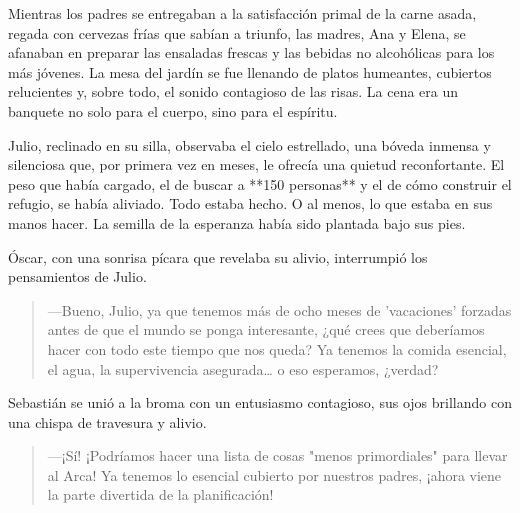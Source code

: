 \documentclass[a4paper,12pt]{book}
\begin{document}
Mientras los padres se entregaban a la satisfacción primal de la carne asada, regada con cervezas frías que sabían a triunfo, las madres, Ana y Elena, se afanaban en preparar las ensaladas frescas y las bebidas no alcohólicas para los más jóvenes. La mesa del jardín se fue llenando de platos humeantes, cubiertos relucientes y, sobre todo, el sonido contagioso de las risas. La cena era un banquete no solo para el cuerpo, sino para el espíritu.

Julio, reclinado en su silla, observaba el cielo estrellado, una bóveda inmensa y silenciosa que, por primera vez en meses, le ofrecía una quietud reconfortante. El peso que había cargado, el de buscar a **150 personas** y el de cómo construir el refugio, se había aliviado. Todo estaba hecho. O al menos, lo que estaba en sus manos hacer. La semilla de la esperanza había sido plantada bajo sus pies.

Óscar, con una sonrisa pícara que revelaba su alivio, interrumpió los pensamientos de Julio.
\begin{quote}
    —Bueno, Julio, ya que tenemos más de ocho meses de 'vacaciones' forzadas antes de que el mundo se ponga interesante, ¿qué crees que deberíamos hacer con todo este tiempo que nos queda? Ya tenemos la comida esencial, el agua, la supervivencia asegurada… o eso esperamos, ¿verdad?
\end{quote}

Sebastián se unió a la broma con un entusiasmo contagioso, sus ojos brillando con una chispa de travesura y alivio.
\begin{quote}
    —¡Sí! ¡Podríamos hacer una lista de cosas "menos primordiales" para llevar al Arca! Ya tenemos lo esencial cubierto por nuestros padres, ¡ahora viene la parte divertida de la planificación!
\end{quote}
\end{document}
